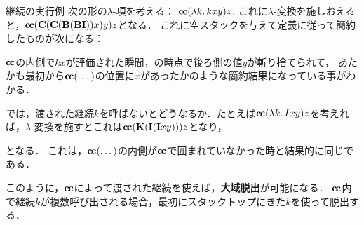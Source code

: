 \documentclass[realisability.tex]{subfiles}
\begin{document}
\begin{example}{継続の実行例}
 次の形の$\lambda$-項を考える：
 $\cc (\lambda k.\, k x y) z$.
 これに$\lambda$-変換を施しおえると，$\cc (\C (\C (\B (\B \I)) x) y) z$となる．
 これに空スタックを与えて定義に従って簡約したものが次になる：
 \def\kz{\conti_{\tikz{\node[draw=black,inner sep=.5ex,minimum width=.75em]{\ensuremath{\scriptstyle z}}}}}
 \begin{center}
 \end{center}
 $\cc$の内側で$kx$が評価された瞬間，の時点で後ろ側の値$y$が斬り捨てられて，
 あたかも最初から$\cc (\dots)$の位置に$x$があったかのような簡約結果になっている事がわかる．

 では，渡された継続$k$を呼ばないとどうなるか．たとえば$\cc (\lambda k.\, I x y) z$を考えれば，$\lambda$-変換を施すとこれは$\cc (\K (\I (\I x y))) z$となり，
 \begin{center}
 \end{center}
 となる．
 これは，$\cc (\dots)$の内側が$\cc$で囲まれていなかった時と結果的に同じである．

 このように，$\cc$によって渡された継続を使えば，\textbf{大域脱出}が可能になる．
 $\cc$内で継続$k$が複数呼び出される場合，最初にスタックトップにきた$k$を使って脱出する．
\end{example}
\end{document}
